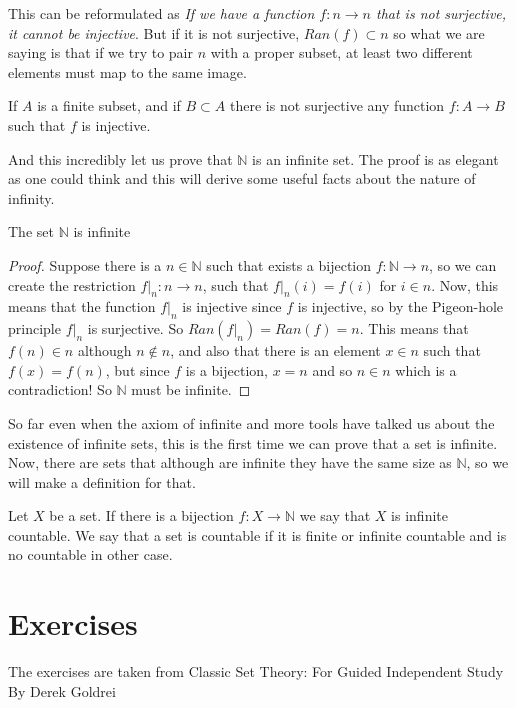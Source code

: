 \documentclass{tufte-handout}
\begin{document}
This can be reformulated as \textit{If we have a function $f: n \to n$ that is not surjective, it cannot be injective}. But if it is not surjective, $Ran(f) \subset n$ so what we are saying is that if we try to pair $n$ with a proper subset, at least two different elements must map to the same image.

\begin{corollary}
	If $A$ is a finite subset, and if $B \subset A$ there is not surjective any function $f: A \to B$ such that $f$ is injective.
\end{corollary}

And this incredibly let us prove that $\mathbb{N}$ is an infinite set. The proof is as elegant as one could think and this will derive some useful facts about the nature of infinity.

\begin{theorem}
	The set $\mathbb{N}$ is infinite
\end{theorem}
\begin{proof}
	Suppose there is a $n \in \mathbb{N}$ such that exists a bijection $f: \mathbb{N} \to n$, so we can create the restriction $f|_n: n \to n$, such that $f|_n(i) = f(i)$ for $i \in n$. Now, this means that the function $f|_n$ is injective since $f$ is injective, so by the Pigeon-hole principle $f|_n$ is surjective. So $Ran(f|_n) = Ran(f) = n$. This means that $f(n) \in n$ although $n \not \in n$, and also that there is an element $x \in n$ such that $f(x) = f(n)$, but since $f$ is a bijection, $x = n$ and so $n \in n$ which is a contradiction! So $\mathbb{N}$ must be infinite.
\end{proof}

So far even when the axiom of infinite and more tools have talked us about the existence of infinite sets, this is the first time we can prove that a set is infinite. Now, there are sets that although are infinite they have the same size as $\mathbb{N}$, so we will make a definition for that.

\begin{definition}
	Let $X$ be a set. If there is a bijection $f: X \to \mathbb{N}$ we say that $X$ is infinite countable. We say that a set is countable if it is finite or infinite countable and is no countable in other case. 
\end{definition}

\section{Exercises}
The exercises are taken from Classic Set Theory: For Guided Independent Study By Derek Goldrei
\end{document}
